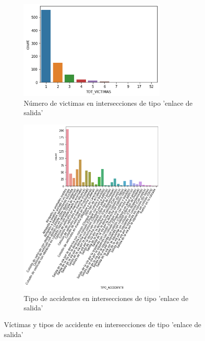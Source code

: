 \begin{figure}[H]
\begin{subfigure}{.5\textwidth}
  \centering
  \includegraphics[width=0.8\textwidth]{imagenes/victimas_caso1.png}
  \caption{Número de victimas en intersecciones de tipo 'enlace de salida'}
  \label{fig:sfig1}
\end{subfigure}%
\begin{subfigure}{.5\textwidth}
  \centering
  \includegraphics[width=0.8\textwidth]{imagenes/tipo_accidente_caso1.png}
  \caption{Tipo de accidentes en intersecciones de tipo 'enlace de salida'}
  \label{fig:sfig2}
\end{subfigure}
\caption{Víctimas y tipos de accidente en intersecciones de tipo 'enlace de salida'}
\label{fig:fig}
\end{figure}

